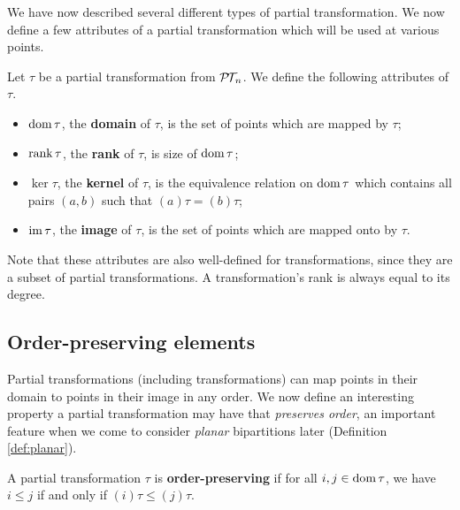 We have now described several different types of partial transformation.  We now
define a few attributes of a partial transformation which will be used at
various points.

\begin{definition}
  Let $\tau$ be a partial transformation from $\mathcal{P\!T\!}_n$.  We define the following
  attributes of $\tau$.
  \begin{itemize}
  \item $\operatorname{dom} \tau$, the \textbf{domain} of $\tau$, is the set of points which
    are mapped by $\tau$;
  \item $\operatorname{rank} \tau$, the \textbf{rank} of $\tau$, is size of $\operatorname{dom} \tau$;
  \item $\ker \tau$, the \textbf{kernel} of $\tau$, is the equivalence relation
    on $\operatorname{dom} \tau$ which contains all pairs $(a,b)$ such that
    $(a)\tau = (b)\tau$;
  \item $\operatorname{im} \tau$, the \textbf{image} of $\tau$, is the set of points which are
    mapped onto by $\tau$.
  \end{itemize}
\end{definition}

Note that these attributes are also well-defined for transformations, since they
are a subset of partial transformations.  A transformation's rank is always
equal to its degree.

\subsection{Order-preserving elements}
\label{sec:order-preserving}

Partial transformations (including transformations) can map points in their
domain to points in their image in any order.  We now define an interesting
property a partial transformation may have that \textit{preserves order}, an
important feature when we come to consider \textit{planar} bipartitions later
(Definition \ref{def:planar}).

\begin{definition}
  A partial transformation $\tau$ is \textbf{order-preserving} if for all
  $i,j \in \operatorname{dom}\tau$, we have $i \leq j$ if and only if $(i)\tau \leq (j)\tau$.
\end{definition}

